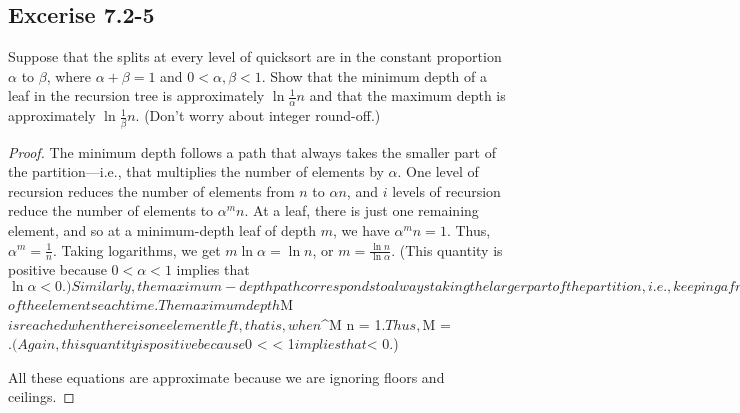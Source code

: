 \documentclass{article}
\begin{document}
\newpage 
%
\subsection*{Excerise 7.2-5}
Suppose that the splits at every level of quicksort are in the constant proportion $\alpha$ to $\beta$, where $\alpha + \beta = 1$ and $0 < \alpha, \beta < 1$. 
Show that the minimum depth of a leaf in the recursion tree is approximately $\ln \frac{1}{\alpha} n$ and that the maximum depth is approximately $\ln \frac{1}{\beta} n$. (Don't worry about integer round-off.)
\begin{proof}
The minimum depth follows a path that always takes the smaller part of the partition—i.e., 
that multiplies the number of elements by $\alpha$. 
One level of recursion reduces the number of elements from $n$ to $\alpha n$, 
and $i$ levels of recursion reduce the number of elements to $\alpha^m n$. 
At a leaf, there is just one remaining element, 
and so at a minimum-depth leaf of depth $m$, we have $\alpha^m n = 1$. 
Thus, $\alpha^m = \frac{1}{n}$. 
Taking logarithms, we get $m \ln \alpha = \ln n$, or $m = \frac{\ln n}{\ln \alpha}$. 
(This quantity is positive because $0 < \alpha < 1$ implies that $\ln \alpha < 0.)


Similarly, the maximum-depth path corresponds to always taking the larger part of the partition, 
i.e., keeping a fraction $\beta$ of the elements each time. 
The maximum depth $M$ is reached when there is one element left, 
that is, when $\beta^M n = 1$. 
Thus, $M = $. 
(Again, this quantity is positive because $0 < \beta < 1$ implies that $\log \beta < 0.)

All these equations are approximate because we are ignoring floors and ceilings.
    
\end{proof}
\end{document}
